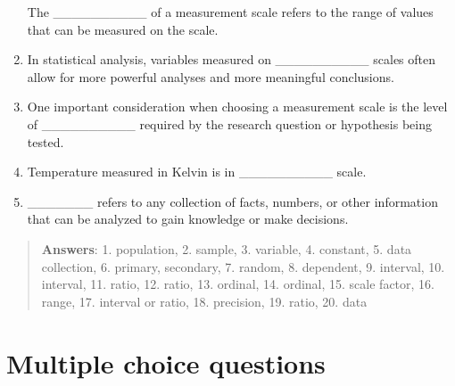 \documentclass[
]{book}
\begin{document}
\begin{enumerate}
  The \_\_\_\_\_\_\_\_\_\_ of a measurement scale refers to the range
  of values that can be measured on the scale.
\item
  In statistical analysis, variables measured on \_\_\_\_\_\_\_\_\_\_
  scales often allow for more powerful analyses and more meaningful
  conclusions.
\item
  One important consideration when choosing a measurement scale is the
  level of \_\_\_\_\_\_\_\_\_\_ required by the research question or
  hypothesis being tested.
\item
  Temperature measured in Kelvin is in \_\_\_\_\_\_\_\_\_\_ scale.
\item
  \_\_\_\_\_\_\_ refers to any collection of facts, numbers, or other
  information that can be analyzed to gain knowledge or make
  decisions.
\end{enumerate}

\begin{quote}
\textbf{Answers}: 1. population, 2. sample, 3. variable, 4. constant, 5. data collection, 6. primary, secondary, 7. random, 8. dependent, 9. interval, 10. interval, 11. ratio, 12. ratio, 13. ordinal, 14. ordinal, 15. scale factor, 16. range, 17. interval or ratio, 18. precision, 19. ratio, 20. data
\end{quote}

\hypertarget{multiple-choice-questions}{%
\section*{Multiple choice questions}\label{multiple-choice-questions}}
\end{document}

